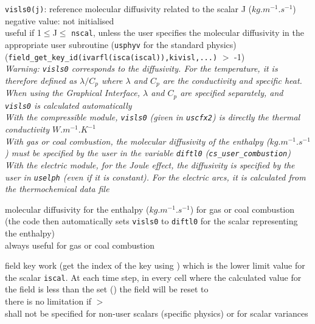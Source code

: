 {{\tt visls0(j)}: reference molecular diffusivity related to the scalar J
($kg.m^{-1}.s^{-1}$)\\
negative value: not initialised\\
useful if 1$\leqslant$J$\leqslant$ {\tt nscal}, unless the user specifies the
molecular diffusivity in the appropriate user subroutine (\texttt{usphyv} for
the standard physics) ({\tt field\_get\_key\_id(ivarfl(isca(iscal)),kivisl,...)} $>$ -1)\\
{\em Warning: {\tt visls0} corresponds to the diffusivity. For the temperature, it is
therefore defined as $\lambda/C_p$ where $\lambda$ and $C_p$ are the
conductivity and specific heat. When using the Graphical Interface, $\lambda$ and
$C_p$ are specified separately, and {\tt visls0} is calculated automatically\\
With the compressible module, {\tt visls0} (given in \texttt{uscfx2}) is directly the
thermal conductivity $W.m^{-1}.K^{-1}$\\
With gas or coal combustion, the molecular diffusivity of the enthalpy
($kg.m^{-1}.s^{-1}$) must be specified by the user in the variable {\tt diftl0}
(\texttt{cs\_user\_combustion})\\
With the electric module, for the Joule effect, the diffusivity is specified by
the user in \texttt{uselph} (even if it is constant). For the electric arcs, it
is calculated from the thermochemical data file}}

{molecular diffusivity for the enthalpy ($kg.m^{-1}.s^{-1}$) for gas or coal
combustion (the code then automatically sets {\tt visls0} to {\tt diftl0} for the scalar
representing the enthalpy)\\
always useful for gas or coal combustion}

{field key work (get the index of the key using
)
which is the lower limit value for the scalar {\tt iscal}. At each time step,
in every cell where the calculated value for the field 
is less than the set 
()
the field will be reset to
\mbox{}\\
there is no limitation if $>$\\
 shall not be specified for non-user scalars (specific physics) or for
scalar variances
}

